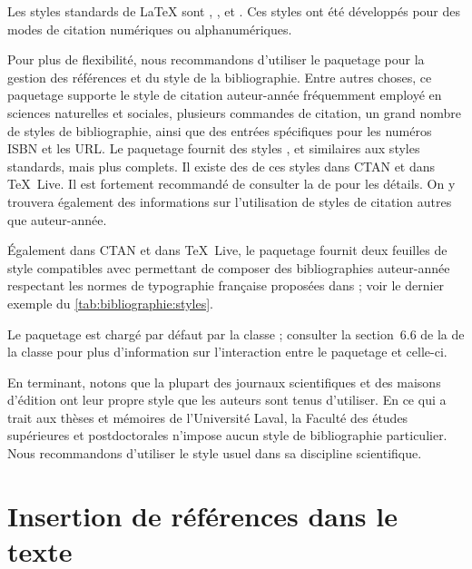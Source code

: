 Les styles standards de {\LaTeX} sont , ,
 et . Ces styles ont été développés pour des
modes de citation numériques ou alphanumériques.

Pour plus de flexibilité, nous recommandons d'utiliser le paquetage
 pour la gestion des références et du style de la
bibliographie. Entre autres choses, ce paquetage supporte le style de
citation auteur-année fréquemment employé en sciences naturelles et
sociales, plusieurs commandes de citation, un grand nombre de styles
de bibliographie, ainsi que des entrées spécifiques pour les numéros
ISBN et les URL. Le paquetage fournit des styles ,
 et  similaires aux styles standards,
mais plus complets. Il existe des %
de ces styles dans CTAN et dans {\TeX}~Live.
Il est fortement recommandé de consulter la %
de  pour les détails. On y trouvera également des
informations sur l'utilisation de styles de citation autres que
auteur-année.

Également dans CTAN et dans {\TeX}~Live, le paquetage
 \citep{francais-bst} fournit deux feuilles de style
compatibles avec  permettant de composer des
bibliographies auteur-année respectant les normes de typographie
française proposées dans \citet{Malo:1996}; voir le dernier exemple du
\autoref{tab:bibliographie:styles}.

Le paquetage  est chargé par défaut par la classe
; consulter la section~6.6 de la %
de la classe pour plus d'information sur l'interaction entre le
paquetage et celle-ci.

En terminant, notons que la plupart des journaux scientifiques et des
maisons d'édition ont leur propre style que les auteurs sont tenus
d'utiliser. En ce qui a trait aux thèses et mémoires de l'Université
Laval, la Faculté des études supérieures et postdoctorales n'impose
aucun style de bibliographie particulier. Nous recommandons
d'utiliser le style usuel dans sa discipline scientifique.



\section{Insertion de références dans le texte}
\label{sec:bibliographie:cite}

